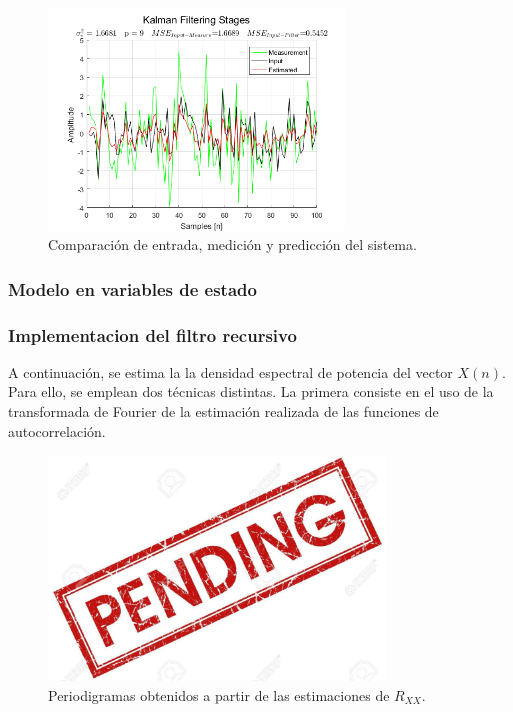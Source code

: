 \begin{figure}[H]
\centering
	\includegraphics[width=0.7\textwidth, trim = {0 0 0 0},clip]{./Imagenes/Kalman_Filter.png}
	\caption{Comparación de entrada, medición y predicción del sistema.}
	\label{fig:kalmanfilter}
\end{figure}

\subsubsection{Modelo en variables de estado}



\subsubsection{Implementacion del filtro recursivo}
A continuación, se estima la la densidad espectral de potencia del vector $X(n)$. Para ello, se emplean dos técnicas distintas. La primera consiste en el uso de la transformada de Fourier de la estimación realizada de las funciones de autocorrelación.
\begin{figure}[H]
\centering
	\includegraphics[width=0.8\textwidth, trim = {0 0 0 0},clip]{./Imagenes/pend.jpg}
	\caption{Periodigramas obtenidos a partir de las estimaciones de $R_{XX}$.}
	\label{fig:period-est}
\end{figure}

